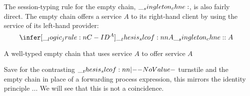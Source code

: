 The session-typing rule for the empty chain, $\__singleton_chne:$, is also fairly direct.
The empty chain offers a service $A$ to its right-hand client by using the service of its left-hand provider:
\begin{equation*}
  \infer[\jrule{C-ID}\smash{^A}]{\slcof{A |- \chne : A}}{}
\end{equation*}
%
\begin{marginfigure}
  \centering
  \caption{A well-typed empty chain that uses service $A$ to offer service $A$}\label{fig:singleton-processes:empty-chain}
\end{marginfigure}%
%
Save for the contrasting $\slcof{|-}$ turnstile and the empty chain in place of a forwarding process expression, this mirrors the identity principle ...
We will see that this is not a coincidence.

